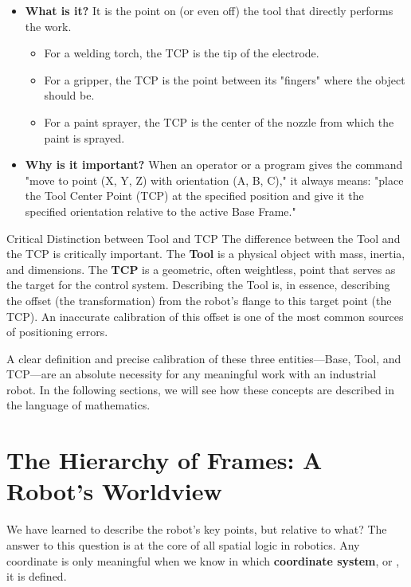 \begin{itemize}
    \item \textbf{What is it?} It is the point on (or even off) the tool that directly performs the work.
    \begin{itemize}
        \item For a welding torch, the TCP is the tip of the electrode.
        \item For a gripper, the TCP is the point between its "fingers" where the object should be.
        \item For a paint sprayer, the TCP is the center of the nozzle from which the paint is sprayed.
    \end{itemize}
    \item \textbf{Why is it important?} When an operator or a program gives the command "move to point (X, Y, Z) with orientation (A, B, C)," it always means: "place the Tool Center Point (TCP) at the specified position and give it the specified orientation relative to the active Base Frame."
\end{itemize}

\begin{tipbox}{Critical Distinction between Tool and TCP}
The difference between the Tool and the TCP is critically important. The \textbf{Tool} is a physical object with mass, inertia, and dimensions. The \textbf{TCP} is a geometric, often weightless, point that serves as the target for the control system. Describing the Tool is, in essence, describing the offset (the transformation) from the robot's flange to this target point (the TCP). An inaccurate calibration of this offset is one of the most common sources of positioning errors.
\end{tipbox}

A clear definition and precise calibration of these three entities—Base, Tool, and TCP—are an absolute necessity for any meaningful work with an industrial robot. In the following sections, we will see how these concepts are described in the language of mathematics.

\section{The Hierarchy of Frames: A Robot's Worldview}

We have learned to describe the robot's key points, but relative to what? The answer to this question is at the core of all spatial logic in robotics. Any coordinate is only meaningful when we know in which \textbf{coordinate system}, or , it is defined.

